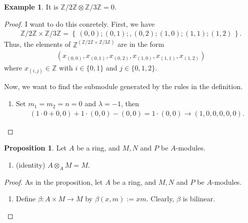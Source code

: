 \documentclass[a4paper]{book}
\theoremstyle{definition}
\newtheorem{example}{Example}[definition]
\newtheorem{proposition}[definition]{Proposition}
\newcommand{\set}[1]{\left\{\, #1 \,\right\}}
\begin{document}
\begin{exmbox}
    \begin{example}
        It is \(\mathbb{Z}/2\mathbb{Z} \otimes \mathbb{Z}/3\mathbb{Z} = 0\).
    \end{example}
\end{exmbox}
\begin{proof}
    I want to do this conretely. First, we have
    \begin{align*}
        \mathbb{Z}/2\mathbb{Z} \times \mathbb{Z}/3\mathbb{Z} = \set{(0, 0); (0, 1);, (0, 2); (1, 0); (1, 1); (1, 2)} \text{.}
    \end{align*}
    Thus, the elements of \(\mathbb{Z}^{(\mathbb{Z}/2\mathbb{Z} \times \mathbb{Z}/3\mathbb{Z})}\) are in the form
    \begin{align*}
        (x_{(0, 0)}, x_{(0, 1)}, x_{(0, 2)}, x_{(1, 0)}, x_{(1, 1)}, x_{(1, 2)})
    \end{align*}
    where \(x_{(i, j)} \in \mathbb{Z}\) with \(i \in \{0, 1\}\) and \(j \in \{0, 1, 2\}\).

    Now, we want to find the submodule generated by the rules in the definition.

    \begin{enumerate}
        \item Set \(m_1 = m_2 = n = 0\) and \(\lambda = -1\), then
        \begin{align*}
            (1 \cdot 0 + 0, 0) + 1 \cdot (0, 0) - (0, 0) = 1 \cdot (0, 0) \rightarrow (1, 0, 0, 0, 0, 0) \text{.}
        \end{align*}
        
    \end{enumerate}
\end{proof}


\begin{thmbox}
    \begin{proposition}
        Let \(A\) be a ring, and \(M, N\) and \(P\) be \(A\)-modules.
        \begin{enumerate}
            \item (identity) \(A \otimes_A M = M\).
        \end{enumerate}
    \end{proposition}
\end{thmbox}
\begin{proof}
    As in the proposition, let \(A\) be a ring, and \(M, N\) and \(P\) be \(A\)-modules.
    \begin{enumerate}
        \item Define \(\beta: A \times M \rightarrow M\) by \(\beta(x, m) := xm\). Clearly, \(\beta\) is bilinear.
    \end{enumerate}
\end{proof}
\end{document}
